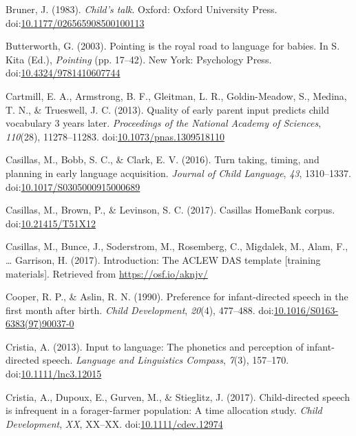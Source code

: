 \documentclass[floatsintext,man]{apa6}
\theoremstyle{definition}
\theoremstyle{definition}
\theoremstyle{definition}
\theoremstyle{remark}
\begin{document}
\hypertarget{ref-bruner1983childs}{}
Bruner, J. (1983). \emph{Child's talk}. Oxford: Oxford University Press.
doi:\href{https://doi.org/10.1177/026565908500100113}{10.1177/026565908500100113}

\hypertarget{ref-butterworth2003pointing}{}
Butterworth, G. (2003). Pointing is the royal road to language for
babies. In S. Kita (Ed.), \emph{Pointing} (pp. 17--42). New York:
Psychology Press.
doi:\href{https://doi.org/10.4324/9781410607744}{10.4324/9781410607744}

\hypertarget{ref-cartmill2013quality}{}
Cartmill, E. A., Armstrong, B. F., Gleitman, L. R., Goldin-Meadow, S.,
Medina, T. N., \& Trueswell, J. C. (2013). Quality of early parent input
predicts child vocabulary 3 years later. \emph{Proceedings of the
National Academy of Sciences}, \emph{110}(28), 11278--11283.
doi:\href{https://doi.org/10.1073/pnas.1309518110}{10.1073/pnas.1309518110}

\hypertarget{ref-casillas2016turn}{}
Casillas, M., Bobb, S. C., \& Clark, E. V. (2016). Turn taking, timing,
and planning in early language acquisition. \emph{Journal of Child
Language}, \emph{43}, 1310--1337.
doi:\href{https://doi.org/10.1017/S0305000915000689}{10.1017/S0305000915000689}

\hypertarget{ref-Casillas-HB}{}
Casillas, M., Brown, P., \& Levinson, S. C. (2017). Casillas HomeBank
corpus. doi:\href{https://doi.org/10.21415/T51X12}{10.21415/T51X12}

\hypertarget{ref-casillas2017ACLEWDAS}{}
Casillas, M., Bunce, J., Soderstrom, M., Rosemberg, C., Migdalek, M.,
Alam, F., \ldots{} Garrison, H. (2017). Introduction: The ACLEW DAS
template {[}training materials{]}. Retrieved from
\url{https://osf.io/aknjv/}

\hypertarget{ref-cooper1990preference}{}
Cooper, R. P., \& Aslin, R. N. (1990). Preference for infant-directed
speech in the first month after birth. \emph{Child Development},
\emph{20}(4), 477--488.
doi:\href{https://doi.org/10.1016/S0163-6383(97)90037-0}{10.1016/S0163-6383(97)90037-0}

\hypertarget{ref-cristia2013input}{}
Cristia, A. (2013). Input to language: The phonetics and perception of
infant-directed speech. \emph{Language and Linguistics Compass},
\emph{7}(3), 157--170.
doi:\href{https://doi.org/10.1111/lnc3.12015}{10.1111/lnc3.12015}

\hypertarget{ref-cristia2017child}{}
Cristia, A., Dupoux, E., Gurven, M., \& Stieglitz, J. (2017).
Child-directed speech is infrequent in a forager-farmer population: A
time allocation study. \emph{Child Development}, \emph{XX}, XX--XX.
doi:\href{https://doi.org/10.1111/cdev.12974}{10.1111/cdev.12974}
\end{document}
